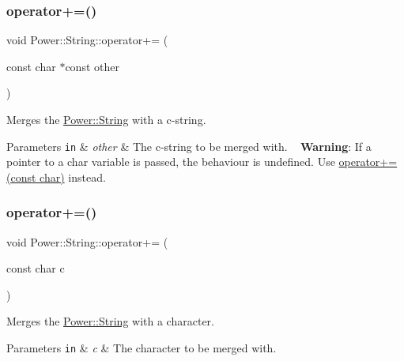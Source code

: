 \subsubsection{\texorpdfstring{operator+=()}{operator+=()}\hspace{0.1cm}{\footnotesize\ttfamily [2/11]}}
{\footnotesize\ttfamily void Power\+::\+String\+::operator+= (\begin{DoxyParamCaption}\item[{const char $\ast$const}]{other }\end{DoxyParamCaption})\hspace{0.3cm}{\ttfamily [inline]}}



Merges the \hyperlink{class_power_1_1_string}{Power\+::\+String} with a c-\/string. 


\begin{DoxyParams}[1]{Parameters}
\mbox{\tt in}  & {\em other} & The c-\/string to be merged with. ~\newline
 {\bfseries Warning}\+: If a pointer to a char variable is passed, the behaviour is undefined. Use \hyperlink{class_power_1_1_string_a52dac2961382313c2817ae2186d09a9e}{operator+=(const char)} instead. \\
\hline
\end{DoxyParams}
\mbox{\label{class_power_1_1_string_a52dac2961382313c2817ae2186d09a9e}} 
\subsubsection{\texorpdfstring{operator+=()}{operator+=()}\hspace{0.1cm}{\footnotesize\ttfamily [3/11]}}
{\footnotesize\ttfamily void Power\+::\+String\+::operator+= (\begin{DoxyParamCaption}\item[{const char}]{c }\end{DoxyParamCaption})\hspace{0.3cm}{\ttfamily [inline]}}



Merges the \hyperlink{class_power_1_1_string}{Power\+::\+String} with a character. 


\begin{DoxyParams}[1]{Parameters}
\mbox{\tt in}  & {\em c} & The character to be merged with. \\
\hline
\end{DoxyParams}
\mbox{\label{class_power_1_1_string_a199f509027c45a73200cd8f6390953ca}} 
